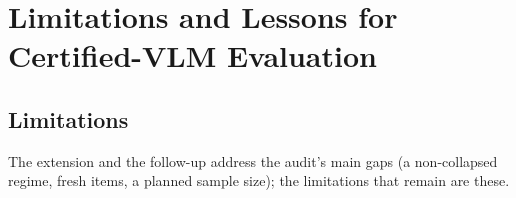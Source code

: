 
\section{Limitations and Lessons for Certified-VLM Evaluation}

\subsection{Limitations}

The extension and the follow-up address the audit's main gaps (a non-collapsed
regime, fresh items, a planned sample size); the limitations that remain are these.

